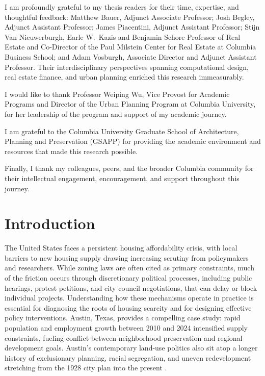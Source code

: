 \documentclass[11pt, letterpaper]{article}
\begin{document}
I am profoundly grateful to my thesis readers for their time, expertise, and thoughtful feedback: Matthew Bauer, Adjunct Associate Professor; Josh Begley, Adjunct Assistant Professor; James Piacentini, Adjunct Assistant Professor; Stijn Van Nieuwerburgh, Earle W.\ Kazis and Benjamin Schore Professor of Real Estate and Co-Director of the Paul Milstein Center for Real Estate at Columbia Business School; and Adam Vosburgh, Associate Director and Adjunct Assistant Professor. Their interdisciplinary perspectives spanning computational design, real estate finance, and urban planning enriched this research immeasurably.

I would like to thank Professor Weiping Wu, Vice Provost for Academic Programs and Director of the Urban Planning Program at Columbia University, for her leadership of the program and support of my academic journey.

I am grateful to the Columbia University Graduate School of Architecture, Planning and Preservation (GSAPP) for providing the academic environment and resources that made this research possible.

Finally, I thank my colleagues, peers, and the broader Columbia community for their intellectual engagement, encouragement, and support throughout this journey.

\newpage
\tableofcontents
\newpage
\listoffigures
\newpage
\listoftables
\newpage
\cleardoublepage
{}
\section{Introduction}

The United States faces a persistent housing affordability crisis, with local barriers to new housing supply drawing increasing scrutiny from policymakers and researchers. While zoning laws are often cited as primary constraints, much of the friction occurs through discretionary political processes, including public hearings, protest petitions, and city council negotiations, that can delay or block individual projects. Understanding how these mechanisms operate in practice is essential for diagnosing the roots of housing scarcity and for designing effective policy interventions. Austin, Texas, provides a compelling case study: rapid population and employment growth between 2010 and 2024 intensified supply constraints, fueling conflict between neighborhood preservation and regional development goals. Austin's contemporary land-use politics also sit atop a longer history of exclusionary planning, racial segregation, and uneven redevelopment stretching from the 1928 city plan into the present \cite{cityaustin1928,way2018,whittemore2014racial,richardson2019dirty}.
\end{document}
